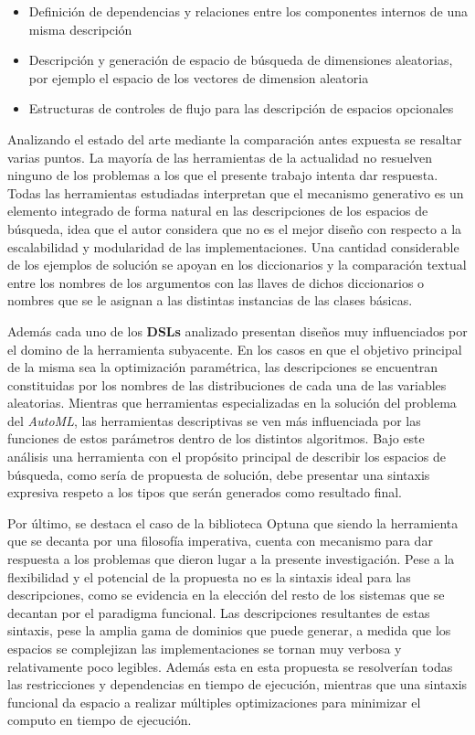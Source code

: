 \begin{itemize}
\begin{itemize}
              \item Definición de dependencias y relaciones entre los componentes internos de una misma descripción
              \item Descripción y generación de espacio de búsqueda de dimensiones aleatorias, por ejemplo el espacio
                    de los vectores de dimension aleatoria
              \item Estructuras de controles de flujo para las descripción de espacios opcionales
          \end{itemize}

\end{itemize}


Analizando el estado del arte mediante la comparación antes expuesta se
resaltar varias puntos. La mayoría de las herramientas de la actualidad
no resuelven ninguno de los problemas a los que el presente trabajo intenta
dar respuesta. Todas las herramientas estudiadas interpretan que el mecanismo
generativo es un elemento integrado de forma natural en las descripciones de
los espacios de búsqueda, idea que el autor considera que no es el mejor
diseño con respecto a la escalabilidad y modularidad de las implementaciones.
Una cantidad considerable de los ejemplos de solución se apoyan en los diccionarios
y la comparación textual entre los nombres de los argumentos con las llaves
de dichos diccionarios o nombres que se le asignan a las distintas instancias de
las clases básicas.

Además cada uno de los {\bf DSLs} analizado presentan diseños muy influenciados
por el domino de la herramienta subyacente. En los casos en que el objetivo
principal de la misma sea la optimización paramétrica, las descripciones se
encuentran constituidas por los nombres de las distribuciones de cada una de
las variables aleatorias. Mientras que herramientas especializadas en la solución
del problema del {\it AutoML}, las herramientas descriptivas se ven más influenciada
por las funciones de estos parámetros dentro de los distintos algoritmos. Bajo este
análisis una herramienta con el propósito principal de describir los espacios de
búsqueda, como sería de propuesta de solución, debe presentar una sintaxis expresiva
respeto a los tipos que serán generados como resultado final.

Por último, se destaca el caso de la biblioteca Optuna que siendo la herramienta
que se decanta por una filosofía imperativa, cuenta con mecanismo para dar respuesta
a los problemas que dieron lugar a la presente investigación. Pese a la flexibilidad
y el potencial de la propuesta no es la sintaxis ideal para las descripciones, como se
evidencia en la elección del resto de los sistemas que se decantan por el paradigma
funcional. Las descripciones resultantes de estas sintaxis, pese la amplia gama de
dominios que puede generar, a medida que los espacios se complejizan las implementaciones
se tornan muy verbosa y relativamente poco legibles. Además esta en esta propuesta se
resolverían todas las restricciones y dependencias en tiempo de ejecución, mientras
que una sintaxis funcional da espacio a realizar múltiples optimizaciones para
minimizar el computo en tiempo de ejecución.

\cite{zelinka2005analytic}